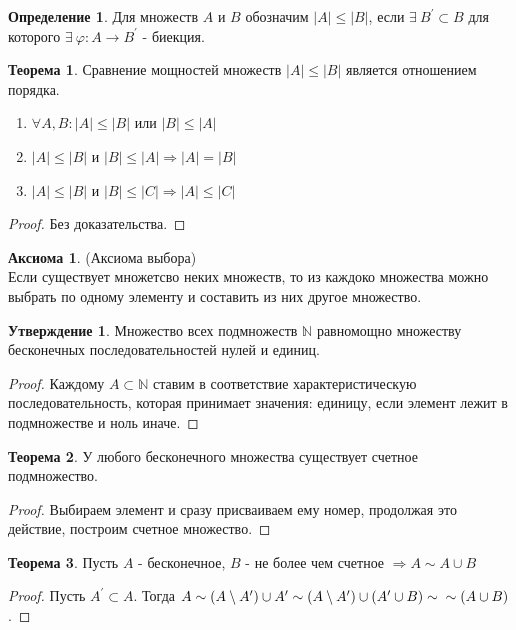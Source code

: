 \documentclass[a4paper, 12pt]{article}
\newcommand{\N}{\mathbb{N}}
\renewcommand{\phi}{\varphi}
\theoremstyle{definition}
\newtheorem*{definition}{Определение}
\newtheorem*{theorem}{Теорема}
\newtheorem*{statement}{Утверждение}
\newtheorem*{axiom}{Аксиома}
\begin{document}
        \begin{definition}
            Для множеств $A$ и $B$ обозначим $|A|\leq |B|$, если $\exists \ B^{\prime} \subset B$ для которого $\exists \ \phi:A\to B^{\prime}$ - биекция.
        \end{definition} 
        \begin{theorem}
            Сравнение мощностей множеств $|A|\leq |B|$ является отношением порядка.
            \begin{enumerate}
                \item $\forall A,B: |A|\leq |B|$ или $|B|\leq |A|$ 
                \item $|A|\leq |B|$ и $|B|\leq |A| \Rightarrow |A|=|B|$
                \item $|A|\leq |B|$ и $|B|\leq |C| \Rightarrow |A|\leq |C|$
            \end{enumerate}
        \end{theorem}
        \begin{proof}
            Без доказательства.
        \end{proof}
        \begin{axiom}(Аксиома выбора)\\
            Если существует множетсво неких множеств, то из каждоко множества можно выбрать по одному элементу и составить из них другое множество.
        \end{axiom}
        \begin{statement}
            Множество всех подмножеств $\N$ равномощно множеству бесконечных последовательностей нулей и единиц.
        \end{statement}
        \begin{proof}
            Каждому $A\subset \N$ ставим в соответствие характеристическую последовательность, которая принимает значения: единицу, если элемент лежит в подмножестве и ноль иначе.
        \end{proof}
        \begin{theorem}
            У любого бесконечного множества существует счетное подмножество.
        \end{theorem} 
        \begin{proof}
            Выбираем элемент и сразу присваиваем ему номер, продолжая это действие, построим счетное множество.
        \end{proof}
        \begin{theorem}
            Пусть $A$ - бесконечное, $B$ - не более чем счетное $\Rightarrow A\sim A\cup B$
        \end{theorem} 
        \begin{proof}
            Пусть $A^{\prime}\subset A$. Тогда $A\sim (A\setminus A^{\prime})\cup A^{\prime}\sim (A\setminus A^{\prime})\cup(A^{\prime}\cup B)\sim\\ \sim(A\cup B)$.
        \end{proof}
\end{document}
